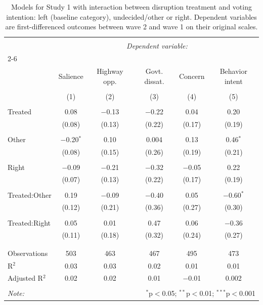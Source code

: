 
\begin{table}[!htbp] \centering 
  \caption{Models for Study 1 with interaction between disruption treatment
          and voting intention: left (baseline category), undecided/other or right. Dependent variables
          are first-differenced outcomes between wave 2 and wave 1 on their original scales.} 
  \label{tab:disruption_bypolitics} 
\begin{tabular}{@{\extracolsep{5pt}}lccccc} 
\\[-1.8ex]\hline 
\hline \\[-1.8ex] 
 & \multicolumn{5}{c}{\textit{Dependent variable:}} \\ 
\cline{2-6} 
\\[-1.8ex] & Salience & Highway opp. & Govt. dissat. & Concern & Behavior intent \\ 
\\[-1.8ex] & (1) & (2) & (3) & (4) & (5)\\ 
\hline \\[-1.8ex] 
 Treated & 0.08 & $-$0.13 & $-$0.22 & 0.04 & 0.20 \\ 
  & (0.08) & (0.13) & (0.22) & (0.17) & (0.19) \\ 
  & & & & & \\ 
 Other & $-$0.20$^{*}$ & 0.10 & 0.004 & 0.13 & 0.46$^{*}$ \\ 
  & (0.08) & (0.15) & (0.26) & (0.19) & (0.21) \\ 
  & & & & & \\ 
 Right & $-$0.09 & $-$0.21 & $-$0.32 & $-$0.05 & 0.22 \\ 
  & (0.07) & (0.13) & (0.22) & (0.17) & (0.19) \\ 
  & & & & & \\ 
 Treated:Other & 0.19 & $-$0.09 & $-$0.40 & 0.05 & $-$0.60$^{*}$ \\ 
  & (0.12) & (0.21) & (0.36) & (0.27) & (0.30) \\ 
  & & & & & \\ 
 Treated:Right & 0.05 & 0.01 & 0.47 & 0.06 & $-$0.36 \\ 
  & (0.11) & (0.18) & (0.32) & (0.24) & (0.27) \\ 
  & & & & & \\ 
\hline \\[-1.8ex] 
Observations & 503 & 463 & 467 & 495 & 473 \\ 
R$^{2}$ & 0.03 & 0.03 & 0.02 & 0.01 & 0.01 \\ 
Adjusted R$^{2}$ & 0.02 & 0.02 & 0.01 & $-$0.01 & 0.002 \\ 
\hline 
\hline \\[-1.8ex] 
\textit{Note:}  & \multicolumn{5}{r}{$^{*}$p$<$0.05; $^{**}$p$<$0.01; $^{***}$p$<$0.001} \\ 
\end{tabular} 
\end{table} 
